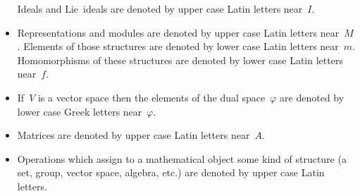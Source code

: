 \begin{itemize}
    Ideals and Lie~ideals are denoted by upper case Latin letters near~$I$.
  \item
    Representations and modules are denoted by upper case Latin letters near~$M$.
    Elements of those structures are denoted by lower case Latin letters near~$m$.
    Homomorphisms of these structures are denoted by lower case Latin letters near~$f$.
  \item
    If~$V$ is a vector space then the elements of the dual space~$\varphi$ are denoted by lower case Greek letters near~$\varphi$.
  \item
    Matrices are denoted by upper case Latin letters near~$A$.
  \item
    Operations which assign to a mathematical object some kind of structure (a set, group, vector space, algebra, etc.) are denoted by upper case Latin letters.
\end{itemize}
